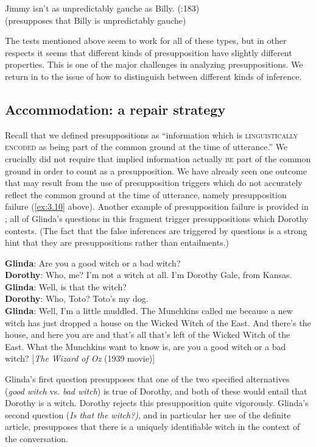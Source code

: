   \ex Jimmy isn’t as unpredictably gauche as Billy.   (\citealt{Levinson1983}:183)\\
  (presupposes that Billy is unpredictably gauche)
                       \z
                       \z


The tests mentioned above seem to work for all of these types, but in other respects it seems that different kinds of presupposition have slightly different properties. This is one of the major challenges in analyzing presuppositions. We return in  to the issue of how to distinguish between different kinds of inference.


\subsection{Accommodation: a repair strategy}\label{sec:3.4.2}

Recall that we defined presuppositions as “information which is \textsc{linguistically encoded} as being part of the common ground at the time of utterance.” We crucially did not require that implied information actually \textsc{be} part of the common ground in order to count as a presupposition. We have already seen one outcome that may result from the use of presupposition triggers which do not accurately reflect the common ground at the time of utterance, namely presupposition failure (\ref{ex:3.10} above). Another example of presupposition failure is provided in ; all of Glinda’s questions in this fragment trigger presuppositions which Dorothy contests. (The fact that the false inferences are triggered by questions is a strong hint that they are presuppositions rather than entailments.)


\ea \label{ex:3.15}
\textbf{Glinda}: Are you a good witch or a bad witch?\\
\textbf{Dorothy}: Who, me?  I’m not a witch at all.  I’m Dorothy Gale, from Kansas.\\
\textbf{Glinda}: Well, is that the witch?\\
\textbf{Dorothy}: Who, Toto?  Toto’s my dog.\\
\textbf{Glinda}: Well, I’m a little muddled. The Munchkins called me because a new witch has just dropped a house on the Wicked Witch of the East. And there’s the house, and here you are and that’s all that’s left of the Wicked Witch of the East. What the Munchkins want to know is, are you a good witch or a bad witch?   [\textit{The Wizard of Oz} (1939 movie)]
\z


Glinda’s first question presupposes that one of the two specified alternatives (\textit{good witch} vs. \textit{bad witch}) is true of Dorothy, and both of these would entail that Dorothy is a witch. Dorothy rejects this presupposition quite vigorously. Glinda’s second question (\textit{Is that the witch?)}, and in particular her use of the definite article, presupposes that there is a uniquely identifiable witch in the context of the conversation.



